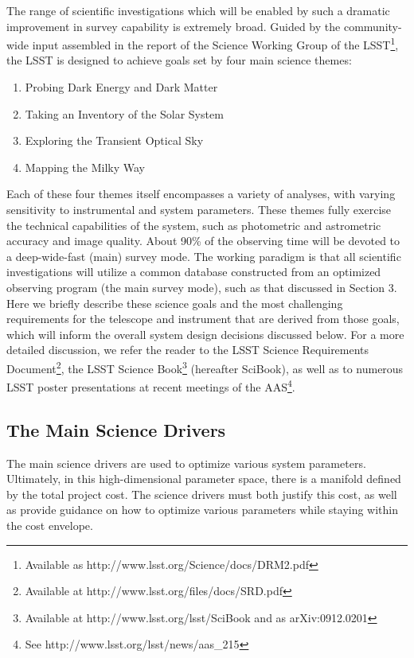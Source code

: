 \documentclass{emulateapj}
\newcommand{\B}[1]{{#1}}
\begin{document}
The range of scientific investigations which will be enabled by such a 
dramatic improvement in survey capability is extremely broad. Guided by
the community-wide input assembled in the report of the Science Working Group of the
LSST\footnote{Available as 
http://www.lsst.org/Science/docs/DRM2.pdf}, the LSST is designed to 
achieve goals set by four main science themes:

\begin{enumerate}
\item Probing Dark Energy and Dark Matter
\item Taking an Inventory of the Solar System
\item Exploring the Transient Optical Sky
\item Mapping the Milky Way
\end{enumerate}

Each of these four themes itself encompasses a variety of analyses, with 
varying sensitivity to instrumental and system parameters. These themes 
fully exercise the technical capabilities of the system, such as photometric 
and astrometric accuracy and image quality. About 90\% of the observing time 
will be devoted to a deep-wide-fast (main) survey mode. The working paradigm is that all 
scientific investigations will utilize a common database constructed from an optimized 
observing program (the main survey mode), such as that discussed in Section 3. 
Here we briefly describe these science goals and the most challenging requirements for the 
telescope and instrument that are derived from those goals, which will
inform the overall system design decisions discussed below.
For a more detailed discussion, we refer the reader to the LSST Science Requirements 
Document\footnote{Available at 
http://www.lsst.org/files/docs/SRD.pdf}, 
\B{the LSST Science Book}\footnote{Available at
http://www.lsst.org/lsst/SciBook and as arXiv:0912.0201} (hereafter SciBook),
as well as to numerous LSST poster presentations at recent
meetings of the AAS\footnote{See
http://www.lsst.org/lsst/news/aas\_215}. 


\subsection{The Main Science Drivers }

The main science drivers are used to optimize various system parameters.
Ultimately, in this high-dimensional parameter space, there is a 
manifold defined by the total project cost. The science
drivers must both justify this cost, as well as provide guidance
on how to optimize various parameters while staying within the cost envelope.
\end{document}
